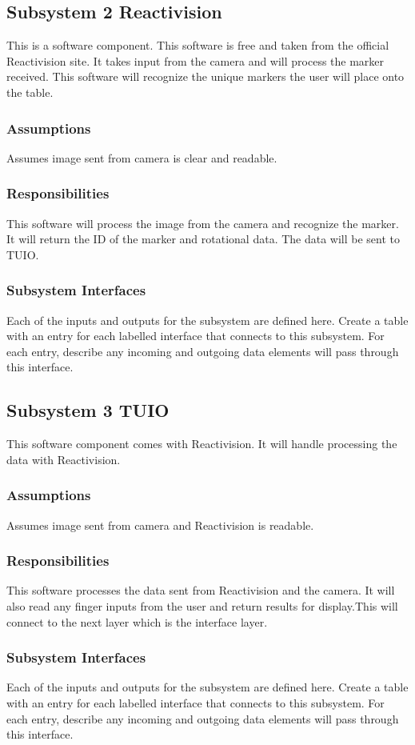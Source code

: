 \subsection{Subsystem 2 Reactivision}
This is a software component. This software is free and taken from the official Reactivision site. It takes input from the camera and will process the marker received. This software will recognize the unique markers the user will place onto the table. 

\subsubsection{Assumptions}
Assumes image sent from camera is clear and readable.  

\subsubsection{Responsibilities}
This software will process the image from the camera and recognize the marker. It will return the ID of the marker and rotational data. The data will be sent to TUIO.

\subsubsection{Subsystem Interfaces}
Each of the inputs and outputs for the subsystem are defined here. Create a table with an entry for each labelled interface that connects to this subsystem. For each entry, describe any incoming and outgoing data elements will pass through this interface.


\subsection{Subsystem 3 TUIO}
This software component comes with Reactivision. It will handle processing the data with Reactivision.

\subsubsection{Assumptions}
Assumes image sent from camera and Reactivision is readable.  

\subsubsection{Responsibilities}
This software processes the data sent from Reactivision and the camera. It will also read any finger inputs from the user and return results for display.This will connect to the next layer which is the interface layer.

\subsubsection{Subsystem Interfaces}
Each of the inputs and outputs for the subsystem are defined here. Create a table with an entry for each labelled interface that connects to this subsystem. For each entry, describe any incoming and outgoing data elements will pass through this interface.

